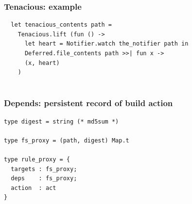 \documentclass{beamer}
\begin{document}
% 
% 
% 


\begin{frame}[fragile]
\frametitle{Tenacious: example}
{\footnotesize
\begin{verbatim}
  let tenacious_contents path =
    Tenacious.lift (fun () ->
      let heart = Notifier.watch the_notifier path in
      Deferred.file_contents path >>| fun x ->
      (x, heart)
    )
 
\end{verbatim}}
\end{frame}




\begin{frame}[fragile]
\frametitle{Depends: persistent record of build action}
{\footnotesize
\begin{verbatim}
type digest = string (* md5sum *)

type fs_proxy = (path, digest) Map.t

type rule_proxy = {
  targets : fs_proxy;
  deps    : fs_proxy;
  action  : act
}

\end{verbatim}}
\end{frame}
\end{document}
